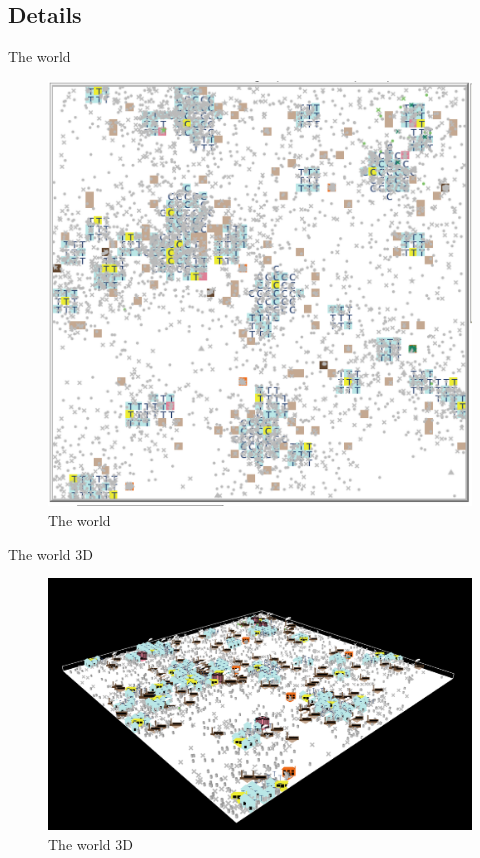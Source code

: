 \documentclass[8pt]{beamer}
\begin{document}
\subsection{Details}

\begin{frame}{The world}

\begin{figure}[H]
\center
\includegraphics[scale=0.35]{world.png}

\caption{The world} 
\label{world}
\end{figure}

\end{frame}

\begin{frame}{The world 3D}

\begin{figure}[H]
\center
\includegraphics[scale=0.55]{world3D.png}

\caption{The world 3D} 
\label{world3D}
\end{figure}

\end{frame}
\end{document}
